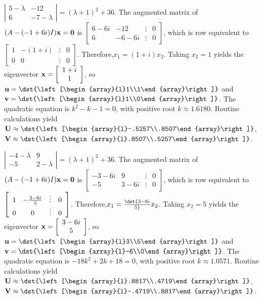 \documentclass[dvips]{book}
\renewcommand{\exer}[1]{\par\medskip\;\noindent{\color{red}\bf #1.}}
\numberwithin{example}{section}
\numberwithin{equation}{section}
\numberwithin{theorem}{section}
\numberwithin{table}{section}
\numberwithin{figure}{section}
\newcommand{\twocol}[2]{\left[\begin{array}{l}#1\\#2\end{array}\right]}
\begin{document}
\exer{10.6.34}
$\left|\begin{array}{cc}5-\lambda&-12\\6&-7-\lambda
\end{array}\right|=(\lambda+1)^2+36$.
The augmented matrix of $(A-(-1+6i)I){\bf x}={\bf 0}$ is
$\left[\begin{array}{cccr}6-6i&-12&\vdots&0\\
6&-6-6i&\vdots&0 \end{array}\right]$,
which is row equivalent to
$\left[\begin{array}{cccr} 1&-(1+i)&\vdots&0\\ 0&0&\vdots&0
\end{array}\right]$.
Therefore,$x_1=(1+i)x_2$. Taking $x_2=1$
yields the eigenvector
 ${\bf x}=\left[\begin{array}{c}1+i\\1\end{array}\right]$,
so ${\bf u}=\dst{\twocol11}$ and ${\bf v}=\dst{\twocol10}$.
The quadratic equation is $k^2-k-1=0$, with positive root
$k\approx1.6180$.
 Routine calculations yield
 ${\bf U}\approx\dst{\twocol{-.5257}{.8507}}$,
${\bf V}\approx\dst{\twocol{.8507}{.5257}}$.


\exer{10.6.36}
$\left|\begin{array}{cc}-4-\lambda&9\\-5&2-\lambda
\end{array}\right|=(\lambda+1)^2+36$.
The augmented matrix of $(A-(-1+6i)I){\bf x}={\bf 0}$ is
$\left[\begin{array}{cccr}-3-6i&9&\vdots&0\\
-5&3-6i&\vdots&0 \end{array}\right]$,
which is row equivalent to
$\left[\begin{array}{cccr} 1&-{3-6i\over5}&\vdots&0\\ 0&0&\vdots&0
\end{array}\right]$.
Therefore,$x_1=\dst{3-6i\over5}x_2$. Taking $x_2=5$
yields the eigenvector
 ${\bf x}=\left[\begin{array}{c}3-6i\\5\end{array}\right]$,
so ${\bf u}=\dst{\twocol35}$ and ${\bf v}=\dst{\twocol{-6}0}$.
The quadratic equation is $-18k^2+2k+18=0$, with positive root
$k\approx1.0571$.
 Routine calculations yield
 ${\bf U}\approx\dst{\twocol{.8817}{.4719}}$,
${\bf V}\approx\dst{\twocol{-.4719}{.8817}}$.
\end{document}
